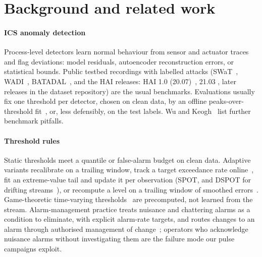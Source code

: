 \documentclass[letterpaper,twocolumn,10pt]{article}
\begin{document}
\section{Background and related work}

\paragraph{ICS anomaly detection}
Process-level detectors learn normal behaviour from sensor and actuator traces and flag deviations:
model residuals, autoencoder reconstruction errors, or statistical bounds. Public testbed recordings
with labelled attacks (SWaT~\cite{goh2016swat}, WADI~\cite{ahmed2017wadi},
BATADAL~\cite{taormina2018batadal}, and the HAI releases: HAI 1.0 (20.07)~\cite{shin2020hai}, 21.03
\cite{shin2021hai}, later releases in the dataset repository) are the usual benchmarks. Evaluations
usually fix one threshold per detector, chosen on clean data, by an offline peaks-over-threshold
fit~\cite{su2019omni}, or, less defensibly, on the test labels. Wu and Keogh~\cite{wu2023benchmarks}
list further benchmark pitfalls.

\paragraph{Threshold rules}
Static thresholds meet a quantile or false-alarm budget on clean data. Adaptive variants recalibrate on
a trailing window, track a target exceedance rate online~\cite{gibbs2021aci}, fit an extreme-value tail
and update it per observation (SPOT, and DSPOT for drifting streams~\cite{siffer2017spot}), or
recompute a level on a trailing window of smoothed errors~\cite{hundman2018telemanom}. Game-theoretic
time-varying thresholds~\cite{ghafouri2016thresholds} are precomputed, not learned from the stream.
Alarm-management practice treats nuisance and chattering alarms as a condition to eliminate, with
explicit alarm-rate targets, and routes changes to an alarm through authorised management of
change~\cite{isa182, eemua191}; operators who acknowledge nuisance alarms without investigating them are
the failure mode our pulse campaigns exploit.
\end{document}
